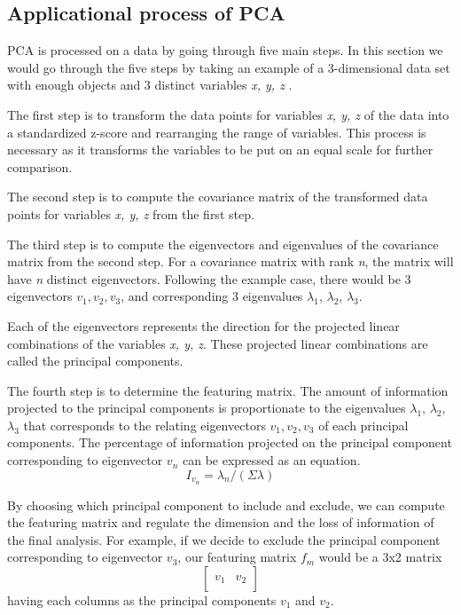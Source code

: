 \newpage
\subsection{Applicational process of PCA}


PCA is processed on a data by going through five main steps. In this section we would go through the five steps by taking an example of a 3-dimensional data set with enough objects and 3 distinct variables \emph{x, y, z} \cite{Jaadi}. 

The first step is to transform the data points for variables \emph{x, y, z} of the data into a standardized z-score and rearranging the range of variables. This process is necessary as it transforms the variables to be put on an equal scale for further comparison.

The second step is to compute the covariance matrix of the transformed data points for variables \emph{x, y, z} from the first step.

The third step is to compute the eigenvectors and eigenvalues of the covariance matrix from the second step. For a covariance matrix with rank \emph{n}, the matrix will have \emph{n} distinct eigenvectors. Following the example case, there would be 3 eigenvectors $v_{1},v_{2},v_{3}$, and corresponding 3 eigenvalues $\lambda_{1}$, $\lambda_{2}$, $\lambda_{3}$.

Each of the eigenvectors represents the direction for the projected linear combinations of the variables \emph{x, y, z}. These projected linear combinations are called the principal components.

The fourth step is to determine the featuring matrix. The amount of information projected to the principal components is proportionate to the eigenvalues $\lambda_{1}$, $\lambda_{2}$, $\lambda_{3}$ that corresponds to the relating eigenvectors $v_{1},v_{2},v_{3}$ of each principal components. The percentage of information projected on the principal component corresponding to eigenvector $v_n$ can be expressed as an equation.
\begin{equation}
I_{v_{n}} = \lambda_{n}/(\Sigma \lambda)
\end{equation}

By choosing which principal component to include and exclude, we can compute the featuring matrix and regulate the dimension and the loss of information of the final analysis. For example, if we decide to exclude the principal component corresponding to eigenvector $v_3$, our featuring matrix $f_m$ would be a 3x2 matrix
\begin{equation}
\begin{bmatrix}
   &   \\
v_{1} & v_{2}\\
   & 
\end{bmatrix}
\end{equation}
having each columns as the principal components $v_1$ and $v_2$.


